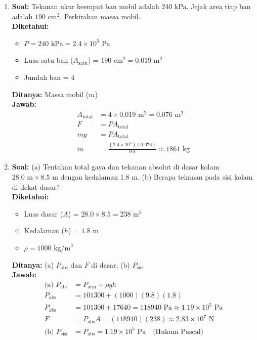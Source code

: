 \documentclass[twocolumn]{article}
\begin{document}
\begin{enumerate}
    \item \textbf{Soal:} Tekanan ukur keempat ban mobil adalah 240 kPa. Jejak area tiap ban adalah $190 \text{ cm}^2$. Perkirakan massa mobil. \\
    \textbf{Diketahui:} 
    \begin{itemize}
        \item $P = 240 \text{ kPa} = 2.4 \times 10^5 \text{ Pa}$
        \item Luas satu ban ($A_{\text{satu}}$) = $190 \text{ cm}^2 = 0.019 \text{ m}^2$
        \item Jumlah ban = 4
    \end{itemize}
    \textbf{Ditanya:} Massa mobil ($m$) \\
    \textbf{Jawab:}
    \begin{align*}
        A_{\text{total}} &= 4 \times 0.019 \text{ m}^2 = 0.076 \text{ m}^2 \\
        F &= P A_{\text{total}} \\
        mg &= P A_{\text{total}} \\
        m &= \frac{(2.4 \times 10^5)(0.076)}{9.8} \approx 1861 \text{ kg}
    \end{align*}

    \item \textbf{Soal:} (a) Tentukan total gaya dan tekanan absolut di dasar kolam $28.0 \text{ m} \times 8.5 \text{ m}$ dengan kedalaman 1.8 m. (b) Berapa tekanan pada sisi kolam di dekat dasar? \\
    \textbf{Diketahui:} 
    \begin{itemize}
        \item Luas dasar ($A$) = $28.0 \times 8.5 = 238 \text{ m}^2$
        \item Kedalaman ($h$) = $1.8 \text{ m}$
        \item $\rho = 1000 \text{ kg/m}^3$
    \end{itemize}
    \textbf{Ditanya:} (a) $P_{\text{abs}}$ dan $F$ di dasar, (b) $P_{\text{sisi}}$ \\
    \textbf{Jawab:}
    \begin{align*}
        \text{(a) } P_{\text{abs}} &= P_{\text{atm}} + \rho g h \\
        P_{\text{abs}} &= 101300 + (1000)(9.8)(1.8) \\
        P_{\text{abs}} &= 101300 + 17640 = 118940 \text{ Pa} \approx 1.19 \times 10^5 \text{ Pa} \\
        F &= P_{\text{abs}} A = (118940)(238) \approx 2.83 \times 10^7 \text{ N} \\
        \text{(b) } P_{\text{sisi}} &= P_{\text{abs}} = 1.19 \times 10^5 \text{ Pa} \quad \text{(Hukum Pascal)}
    \end{align*}


\end{enumerate}
\end{document}

